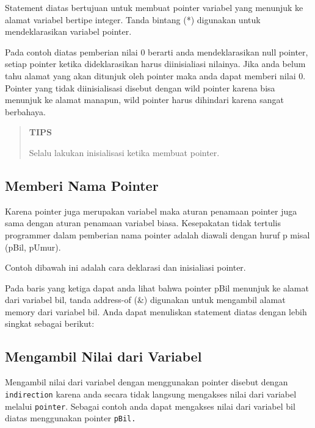 

Statement diatas bertujuan untuk membuat pointer variabel yang menunjuk
ke alamat variabel bertipe integer. Tanda bintang (*) digunakan untuk
mendeklarasikan variabel pointer.

Pada contoh diatas pemberian nilai 0 berarti anda mendeklarasikan null
pointer, setiap pointer ketika dideklarasikan harus diinisialiasi
nilainya. Jika anda belum tahu alamat yang akan ditunjuk oleh pointer
maka anda dapat memberi nilai 0. Pointer yang tidak diinisialisasi
disebut dengan wild pointer karena bisa menunjuk ke alamat manapun, wild
pointer harus dihindari karena sangat berbahaya.

\begin{quotation}
{\LARGE {}} \textbf{TIPS}

 Selalu lakukan inisialisasi ketika membuat pointer.
\end{quotation}


\subsection{Memberi Nama Pointer}\label{memberi-nama-pointer}

Karena pointer juga merupakan variabel maka aturan penamaan pointer juga
sama dengan aturan penamaan variabel biasa. Kesepakatan tidak tertulis
programmer dalam pemberian nama pointer adalah diawali dengan huruf p
misal (pBil, pUmur).

Contoh dibawah ini adalah cara deklarasi dan inisialiasi pointer.



Pada baris yang ketiga dapat anda lihat bahwa pointer pBil menunjuk ke
alamat dari variabel bil, tanda address-of (\&) digunakan untuk
mengambil alamat memory dari variabel bil. Anda dapat menuliskan
statement diatas dengan lebih singkat sebagai berikut:



\subsection{Mengambil Nilai dari
Variabel}\label{mengambil-nilai-dari-variabel}

Mengambil nilai dari variabel dengan menggunakan pointer disebut dengan
\texttt{indirection} karena anda secara tidak langsung mengakses nilai
dari variabel melalui \texttt{pointer}. Sebagai contoh anda dapat
mengakses nilai dari variabel bil diatas menggunakan pointer
\texttt{pBil.}

